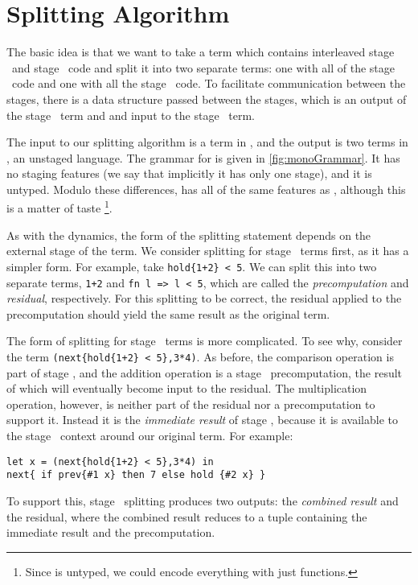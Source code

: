 
\section{Splitting Algorithm}

The basic idea is that we want to take a term which contains interleaved stage \bbone\ and stage \bbtwo\ code
and split it into two separate terms: one with all of the stage \bbone\ code and one with all the stage \bbtwo\ code.
To facilitate communication between the stages, there is a data structure passed between the stages, 
which is an output of the stage \bbone\ term and and input to the stage \bbtwo\ term.

The input to our splitting algorithm is a term in \lang, and the output is two terms in \langmono, an
unstaged language.  The grammar for \langmono is given in \ref{fig:monoGrammar}.  It has no
staging features (we say that implicitly it has only one stage), and it is untyped.  
Modulo these differences, \langmono has all of the same features as \lang, 
although this is a matter of taste
\footnote{Since \lang is untyped, we could encode everything with just functions.}.

As with the dynamics, the form of the splitting statement depends on the external stage of the term.
We consider splitting for stage \bbtwo\ terms first, as it has a simpler form.  
For example, take \verb|hold{1+2} < 5|.
We can split this into two separate terms, \verb|1+2| and \verb|fn l => l < 5|, 
which are called the {\em precomputation} and {\em residual}, respectively.  
For this splitting to be correct, the residual applied to the precomputation should yield the same result as the original term.  

The form of splitting for stage \bbone\ terms is more complicated.
To see why, consider the term \verb|(next{hold{1+2} < 5},3*4)|.
As before, the comparison operation is part of stage \bbtwo, 
and the addition operation is a stage \bbone\ precomputation, the result of which will eventually become input to the residual.
The multiplication operation, however, is neither part of the residual nor a precomputation to support it.
Instead it is the {\em immediate result} of stage \bbone, 
because it is available to the stage \bbone\ context around our original term.
For example:
\begin{lstlisting}
let x = (next{hold{1+2} < 5},3*4) in
next{ if prev{#1 x} then 7 else hold {#2 x} }
\end{lstlisting}
To support this, stage \bbone\ splitting produces two outputs: the {\em combined result} and the residual,
where the combined result reduces to a tuple containing the immediate result and the precomputation.

